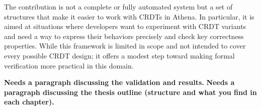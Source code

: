 The contribution is not a complete or fully automated system but a set of structures that make it easier to work with CRDTs in Athena. In particular, it is aimed at situations where developers want to experiment with CRDT variants and need a way to express their behaviors precisely and check key correctness properties. While this framework is limited in scope and not intended to cover every possible CRDT design; it offers a modest step toward making formal verification more practical in this domain.

\textbf{Needs a paragraph discussing the validation and results.}
\textbf{Needs a paragraph discussing the thesis outline (structure and what you find in each chapter).}

\endinput